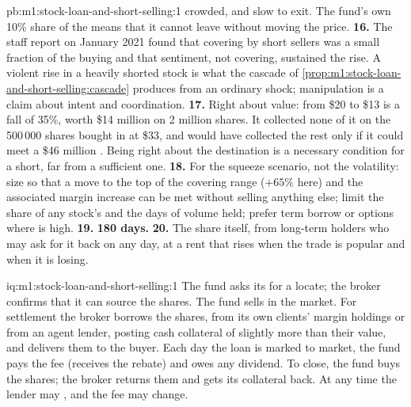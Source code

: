 \begin{solution}{pb:m1:stock-loan-and-short-selling:1}
crowded, and slow to exit. The fund's own 10\% share of the 
means that it cannot leave without moving the price.
\textbf{16.} The staff report on January 2021 found that covering by short
sellers was a small fraction of the buying and that sentiment, not covering,
sustained the rise. A violent rise in a heavily shorted stock is what the
cascade of \cref{prop:m1:stock-loan-and-short-selling:cascade} produces from
an ordinary shock; manipulation is a claim about intent and coordination.
\textbf{17.} Right about value: from \$20 to \$13 is a fall of 35\%, worth \$14
million on 2 million shares. It collected none of it on the 500\,000 shares
bought in at \$33, and would have collected the rest only if it could meet a
\$46 million . Being right about the destination is a necessary
condition for a short, far from a sufficient one.
\textbf{18.} For the squeeze scenario, not the volatility: size so that a
move to the top of the covering range ($+65\%$ here) and the associated
margin increase can be met without selling anything else; limit the share of
any stock's  and the days of volume held; prefer term borrow
or options where  is high.
\textbf{19.} \textbf{180 days.}
\textbf{20.} The share itself, from long-term holders who may ask for it back
on any day, at a rent that rises when the trade is popular and when it is
losing.
\end{solution}

\begin{solution}{iq:m1:stock-loan-and-short-selling:1}
The fund asks its  for a locate; the broker confirms that it can
source the shares. The fund sells in the market. For settlement the broker
borrows the shares, from its own clients' margin holdings or from an agent
lender, posting cash collateral of slightly more than their value, and
delivers them to the buyer. Each day the loan is marked to market, the fund
pays the fee (receives the rebate) and owes any dividend. To close, the fund
buys the shares; the broker returns them and gets its collateral back. At any
time the lender may , and the fee may change.
\end{solution}

